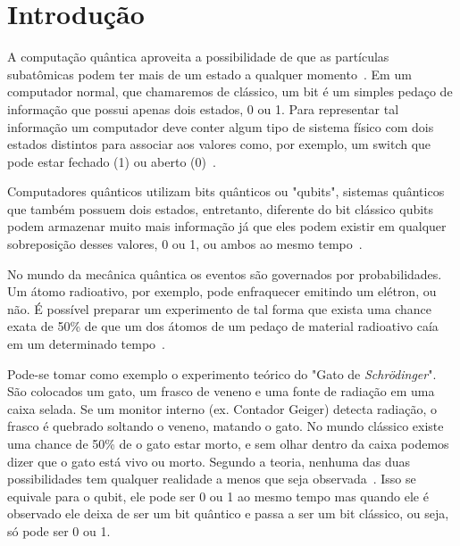 \documentclass[a4paper, 12pt, oneside]{book}
\begin{document}
\tableofcontents

\thispagestyle{myheadings}


\listoffigures
{}

\thispagestyle{myheadings}


\listoftables
{}

\thispagestyle{myheadings}


\pagebreak
{}

\chapter{Introdução}
\thispagestyle{empty}

A computação quântica aproveita a possibilidade de que as partículas subatômicas podem ter mais de um estado a qualquer momento~\cite{wiredQC}. Em um computador normal, que chamaremos de clássico, um bit é um simples pedaço de informação que possui apenas dois estados, 0 ou 1. Para representar tal informação um computador deve conter algum tipo de sistema físico com dois estados distintos para associar aos valores como, por exemplo, um switch que pode estar fechado (1) ou aberto (0)~\cite{mermin}.

Computadores quânticos utilizam bits quânticos ou "qubits", sistemas quânticos que também possuem dois estados, entretanto, diferente do bit clássico qubits podem armazenar muito mais informação já que eles podem existir em qualquer sobreposição desses valores, 0 ou 1, ou ambos ao mesmo tempo~\cite{wiredQC}. 

No mundo da mecânica quântica os eventos são governados por probabilidades. Um átomo radioativo, por exemplo, pode enfraquecer emitindo um elétron, ou não. É possível preparar um experimento de tal forma que exista uma chance exata de 50\% de que um dos átomos de um pedaço de material radioativo caía em um determinado tempo~\cite{gribbin}.

Pode-se tomar como exemplo o experimento teórico do "Gato de \textit{Schrödinger}". São colocados um gato, um frasco de veneno e uma fonte de radiação em uma caixa selada. Se um monitor interno (ex. Contador Geiger) detecta radiação, o frasco é quebrado soltando o veneno, matando o gato. No mundo clássico existe uma chance de 50\% de o gato estar morto, e sem olhar dentro da caixa podemos dizer que o gato está vivo ou morto. Segundo a teoria, nenhuma das duas possibilidades tem qualquer realidade a menos que seja observada~\cite{gribbin}. Isso se equivale para o qubit, ele pode ser 0 ou 1 ao mesmo tempo mas quando ele é observado ele deixa de ser um bit quântico e passa a ser um bit clássico, ou seja, só pode ser 0 ou 1.
\end{document}
